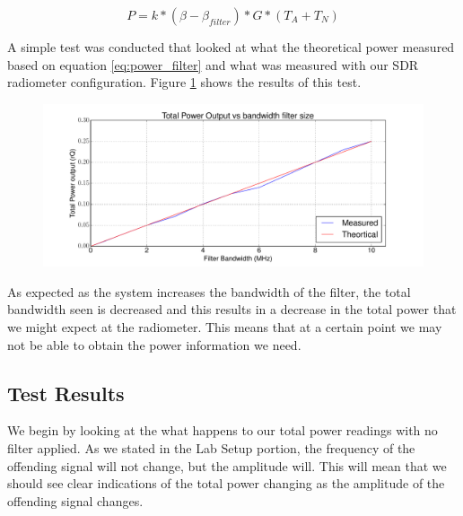 \begin{equation} \label{eq:power_filter}
P=k*(\beta - \beta_{filter})*G*(T_{A}+T_{N})
\end{equation}

A simple test was conducted that looked at what the theoretical power measured based on equation \ref{eq:power_filter} and what was measured with our SDR radiometer configuration.  Figure \ref{powervsbw} shows the results of this test.

\begin{figure}[h!tb] \centering

\includegraphics[width=\textwidth]{Experiments/Exp5/combined_plot.pdf}

\label{powervsbw}
\end{figure}

As expected as the system increases the bandwidth of the filter, the total bandwidth seen is decreased and this results in a decrease in the total power that we might expect at the radiometer.  This means that at a certain point we may not be able to obtain the power information we need.

\subsection{Test Results}
We begin by looking at the what happens to our total power readings with no filter applied.  As we stated in the Lab Setup portion, the frequency of the offending signal will not change, but the amplitude will.  This will mean that we should see clear indications of the total power changing as the amplitude of the offending signal changes.  

